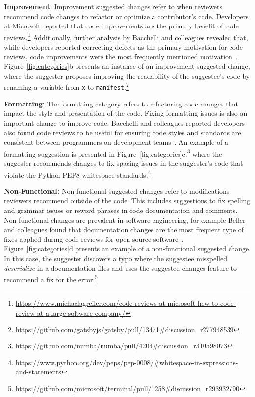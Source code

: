 \textbf{Improvement:} Improvement suggested changes refer to when reviewers recommend code changes to refactor or optimize a contributor's code. Developers at Microsoft reported that code improvements are the primary benefit of code reviews.\footnote{\url{https://www.michaelagreiler.com/code-reviews-at-microsoft-how-to-code-review-at-a-large-software-company/}} Additionally, further analysis by Bacchelli and colleagues revealed that, while developers reported correcting defects as the primary motivation for code reviews, code improvements were the most frequently mentioned motivation~\cite{bacchelli2013codereview}. Figure~\ref{fig:categories}b presents an instance of an improvement suggested change, where the suggester proposes improving the readability of the suggestee's code by renaming a variable from \texttt{x} to \texttt{manifest}.\footnote{\url{https://github.com/gatsbyjs/gatsby/pull/13471#discussion_r277948539}}

\textbf{Formatting:} The formatting category refers to refactoring code changes that impact the style and presentation of the code. Fixing formatting issues is also an important change to improve code. Bacchelli and colleagues reported developers also found code reviews to be useful for ensuring code styles and standards are consistent between programmers on development teams~\cite{bacchelli2013codereview}. An example of a formatting suggestion is presented in Figure~\ref{fig:categories}c.\footnote{\url{https://github.com/numba/numba/pull/4204#discussion_r310598073}} where the suggester recommends changes to fix spacing issues in the suggester's code that violate the Python PEP8 whitespace standards.\footnote{\url{https://www.python.org/dev/peps/pep-0008/#whitespace-in-expressions-and-statements}}

\textbf{Non-Functional:} Non-functional suggested changes refer to modifications reviewers recommend outside of the code. This includes suggestions to fix spelling and grammar issues or reword phrases in code documentation and comments. Non-functional changes are prevalent in software engineering, for example Beller and colleagues found that documentation changes are the most frequent type of fixes applied during code reviews for open source software~\cite{beller2014modern}. Figure~\ref{fig:categories}d presents an example of a non-functional suggested change. In this case, the suggester discovers a typo where the suggestee misspelled \textit{deserialize} in a documentation files and uses the suggested changes feature to recommend a fix for the error.\footnote{\url{https://github.com/microsoft/terminal/pull/1258#discussion_r293932790}}

